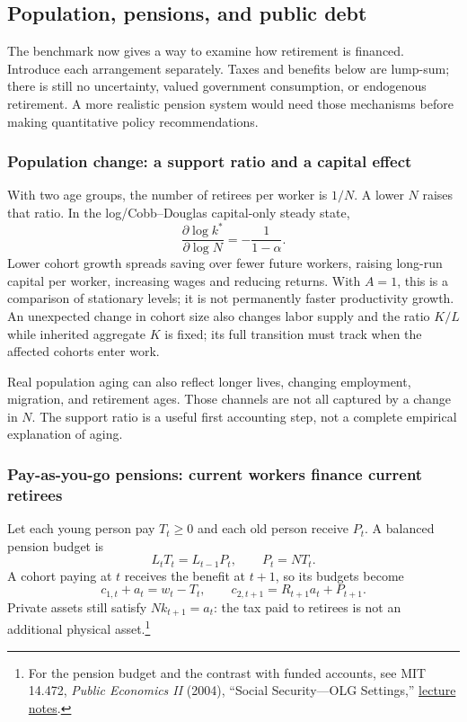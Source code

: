 \subsection{Population, pensions, and public debt}\label{sec:olg-policy}

The benchmark now gives a way to examine how retirement is financed.
Introduce each arrangement separately. Taxes and benefits below are lump-sum;
there is still no uncertainty, valued government consumption, or endogenous
retirement. A more realistic pension system would need those mechanisms
before making quantitative policy recommendations.

\subsubsection{Population change: a support ratio and a capital effect}

With two age groups, the number of retirees per worker is $1/N$. A lower
$N$ raises that ratio. In the log/Cobb--Douglas capital-only steady state,
\begin{equation}
\frac{\partial\log k^*}{\partial\log N}=-\frac{1}{1-\alpha}.
\end{equation}
Lower cohort growth spreads saving over fewer future workers, raising
long-run capital per worker, increasing wages and reducing returns. With
$A=1$, this is a comparison of stationary levels; it is not permanently
faster productivity growth. An unexpected change in cohort size also changes
labor supply and the ratio $K/L$ while inherited aggregate $K$ is fixed;
its full transition must track when the affected cohorts enter work.

Real population aging can also reflect longer lives, changing employment,
migration, and retirement ages. Those channels are not all captured by a
change in $N$. The support ratio is a useful first accounting step, not a
complete empirical explanation of aging.

\subsubsection{Pay-as-you-go pensions: current workers finance current retirees}

Let each young person pay $T_t\geq0$ and each old person receive $P_t$.
A balanced pension budget is
\begin{equation}\label{eq:olg-payg-budget}
L_tT_t=L_{t-1}P_t,\qquad P_t=NT_t.
\end{equation}
A cohort paying at $t$ receives the benefit at $t+1$, so its budgets become
\begin{equation}
c_{1,t}+a_t=w_t-T_t,\qquad
c_{2,t+1}=R_{t+1}a_t+P_{t+1}.
\end{equation}
Private assets still satisfy $Nk_{t+1}=a_t$: the tax paid to retirees is not
an additional physical asset.\footnote{For the pension budget and the contrast
with funded accounts, see MIT 14.472, \textit{Public Economics II} (2004),
``Social Security---OLG Settings,''
\href{https://ocw.mit.edu/courses/14-472-public-economics-ii-spring-2004/resources/socisecurolgsett-1/}{lecture notes}.}

